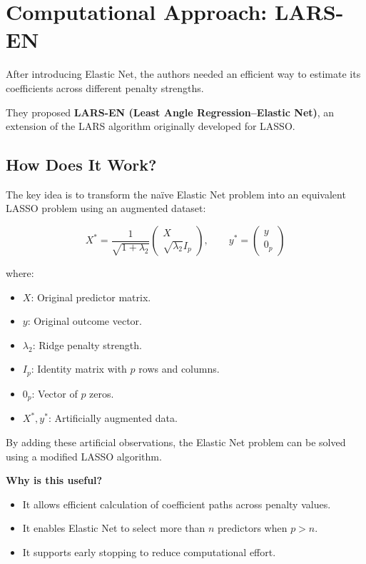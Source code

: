 \documentclass[
  letterpaper,
  DIV=11,
  numbers=noendperiod]{scrreprt}
\providecommand{\tightlist}{%
  \setlength{\itemsep}{0pt}\setlength{\parskip}{0pt}}
\begin{document}
\section{Computational Approach:
LARS-EN}\label{computational-approach-lars-en}

After introducing Elastic Net, the authors needed an efficient way to
estimate its coefficients across different penalty strengths.

They proposed \textbf{LARS-EN (Least Angle Regression--Elastic Net)}, an
extension of the LARS algorithm originally developed for LASSO.

\subsection{How Does It Work?}\label{how-does-it-work}

The key idea is to transform the naïve Elastic Net problem into an
equivalent LASSO problem using an augmented dataset:

\[
X^*=\frac{1}{\sqrt{1+\lambda_2}}
\begin{pmatrix}
X\\
\sqrt{\lambda_2}I_p
\end{pmatrix},
\qquad
y^*=
\begin{pmatrix}
y\\
0_p
\end{pmatrix}
\]

where:

\begin{itemize}
\tightlist
\item
  \(X\): Original predictor matrix.
\item
  \(y\): Original outcome vector.
\item
  \(\lambda_2\): Ridge penalty strength.
\item
  \(I_p\): Identity matrix with \(p\) rows and columns.
\item
  \(0_p\): Vector of \(p\) zeros.
\item
  \(X^*,y^*\): Artificially augmented data.
\end{itemize}

By adding these artificial observations, the Elastic Net problem can be
solved using a modified LASSO algorithm.

\textbf{Why is this useful?}

\begin{itemize}
\tightlist
\item
  It allows efficient calculation of coefficient paths across penalty
  values.
\item
  It enables Elastic Net to select more than \(n\) predictors when
  \(p>n\).
\item
  It supports early stopping to reduce computational effort.
\end{itemize}
\end{document}
